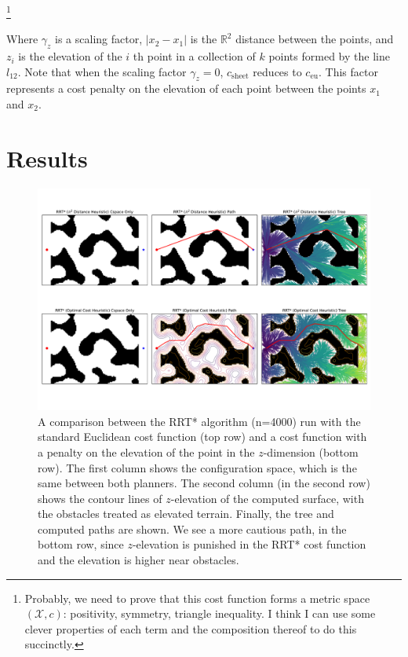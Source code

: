 \documentclass[letterpaper, 12pt]{article}
\begin{document}
\footnote{
Probably, we need to prove that this cost function forms a metric space $(\mathcal{X}, c)$: positivity, symmetry,  triangle inequality. I think I can use some clever properties of each term and the composition thereof to do this succinctly.}

Where $\gamma_z$ is a scaling factor, $|x_2-x_1|$ is the $\mathbb{R}^2$ distance between the points, and $z_i$ is the elevation of the $i$ th point in a collection of $k$ points formed by the line $l_{12}$. Note that when the scaling factor $\gamma_z=0$, $c_\text{sheet}$ reduces to $c_\text{eu}$. This factor represents a cost penalty on the elevation of each point between the points $x_1$ and $x_2$. 

\section{Results}
\begin{figure}
    \centering
    \includegraphics[width=0.9\linewidth]{./figures/rrt_surface_fig.pdf}
    \caption{A comparison between the RRT* algorithm (n=4000) run with the standard Euclidean cost function (top row) and a cost function with a penalty on the elevation of the point in the $z$-dimension (bottom row). The first column shows the configuration space, which is the same between both planners. The second column (in the second row) shows the contour lines of $z$-elevation of the computed surface, with the obstacles treated as elevated terrain. Finally, the tree and computed paths are shown. We see a more cautious path, in the bottom row, since $z$-elevation is punished in the RRT* cost function and the elevation is higher near obstacles.}
\end{figure}

\printbibliography
\end{document}

